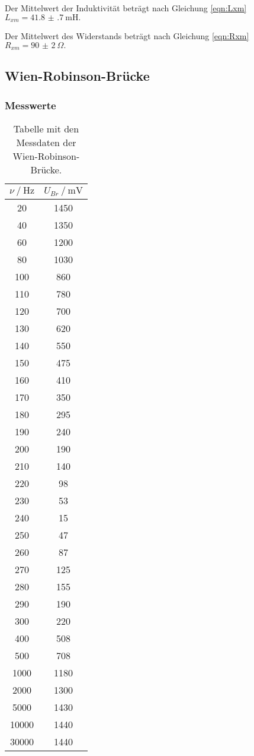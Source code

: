 Der Mittelwert der Induktivität beträgt nach Gleichung \eqref{eqn:Lxm}
$L_{xm} = \SI{41.8(7)}{\milli\henry}.$

Der Mittelwert des Widerstands beträgt nach Gleichung \eqref{eqn:Rxm}
$R_{xm} = \SI{90(2)}{\Omega}.$

\subsection{Wien-Robinson-Brücke}

\subsubsection{Messwerte}

\begin{table}
  \centering
  \caption{Tabelle mit den Messdaten der Wien-Robinson-Brücke.}
  \label{tab:frequenz}
  \begin{tabular}{c c}
    \toprule
    $\nu \ /\ \si{\hertz}$ & $U_{Br} \ /\ \si{\milli\volt}$\\
    \midrule
    20 & 1450\\
    40 & 1350\\
    60 & 1200\\
    80 & 1030\\
    100 & 860\\
    110 & 780\\
    120 & 700\\
    130 & 620\\
    140 & 550\\
    150 & 475\\
    160 & 410\\
    170 & 350\\
    180 & 295\\
    190 & 240\\
    200 & 190\\
    210 & 140\\
    220 & 98\\
    230 & 53\\
    240 & 15\\
    250 & 47\\
    260 & 87\\
    270 & 125\\
    280 & 155\\
    290 & 190\\
    300 & 220\\
    400 & 508\\
    500 & 708\\
    1000 & 1180\\
    2000 & 1300\\
    5000 & 1430\\
    10000 & 1440\\
    30000 & 1440\\
    \bottomrule
  \end{tabular}
\end{table}

